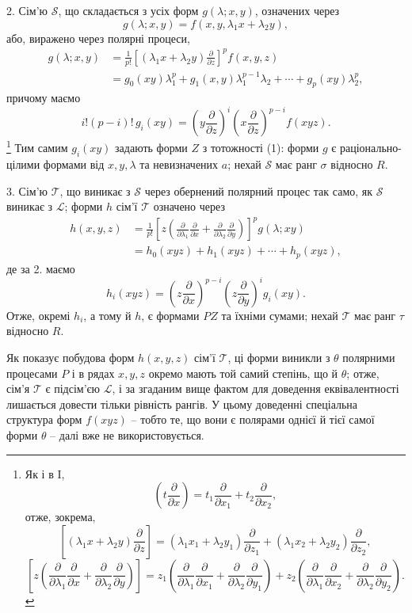 \documentclass[11pt]{article}
\begin{document}
2. Сім'ю $\mathcal S$, що складається з усіх форм $g(\lambda;x,y)$, означених через
\[
  g(\lambda;x,y)=f(x,y,\lambda_1x+\lambda_2y),
\]
або, виражено через полярні процеси,
\[
\begin{aligned}
  g(\lambda;x,y)
  &=\frac1{p!}\left[(\lambda_1x+\lambda_2y)\frac{\partial}{\partial z}\right]^p f(x,y,z) \\
  &=g_0(xy)\lambda_1^p+g_1(x,y)\lambda_1^{p-1}\lambda_2+\cdots+g_p(xy)\lambda_2^p,
\end{aligned}
\]
причому маємо
\[
  i!(p-i)!\,g_i(xy)=
  \left(y\frac{\partial}{\partial z}\right)^i
  \left(x\frac{\partial}{\partial z}\right)^{p-i}f(xyz).
\]
\footnote{Як і в I,
\[
 \left(t\frac{\partial}{\partial x}\right)=t_1\frac{\partial}{\partial x_1}+t_2\frac{\partial}{\partial x_2},
\]
отже, зокрема,
\[
 \left[(\lambda_1x+\lambda_2y)\frac{\partial}{\partial z}\right]
 = (\lambda_1x_1+\lambda_2y_1)\frac{\partial}{\partial z_1}
 + (\lambda_1x_2+\lambda_2y_2)\frac{\partial}{\partial z_2},
\]
\[
 \left[z\left(\frac{\partial}{\partial\lambda_1}\frac{\partial}{\partial x}
 +\frac{\partial}{\partial\lambda_2}\frac{\partial}{\partial y}\right)\right]
 =z_1\left(\frac{\partial}{\partial\lambda_1}\frac{\partial}{\partial x_1}
 +\frac{\partial}{\partial\lambda_2}\frac{\partial}{\partial y_1}\right)
 +z_2\left(\frac{\partial}{\partial\lambda_1}\frac{\partial}{\partial x_2}
 +\frac{\partial}{\partial\lambda_2}\frac{\partial}{\partial y_2}\right).
\]}
Тим самим $g_i(xy)$ задають форми $Z$ з тотожності (1): форми $g$ є раціонально-цілими формами від $x,y,\lambda$ та невизначених $a$; нехай $\mathcal S$ має ранг $\sigma$ відносно $R$.

3. Сім'ю $\mathcal T$, що виникає з $\mathcal S$ через обернений полярний процес так само, як $\mathcal S$ виникає з $\mathcal L$; форми $h$ сім'ї $\mathcal T$ означено через
\[
\begin{aligned}
 h(x,y,z)
 &=\frac1{p!}\left[z\left(\frac{\partial}{\partial\lambda_1}\frac{\partial}{\partial x}
 +\frac{\partial}{\partial\lambda_2}\frac{\partial}{\partial y}\right)\right]^p g(\lambda;xy)\\
 &=h_0(xyz)+h_1(xyz)+\cdots+h_p(xyz),
\end{aligned}
\]
де за 2. маємо
\[
  h_i(xyz)=
  \left(z\frac{\partial}{\partial x}\right)^{p-i}
  \left(z\frac{\partial}{\partial y}\right)^i g_i(xy).
\]
Отже, окремі $h_i$, а тому й $h$, є формами $PZ$ та їхніми сумами; нехай $\mathcal T$ має ранг $\tau$ відносно $R$.

Як показує побудова форм $h(x,y,z)$ сім'ї $\mathcal T$, ці форми виникли з $\theta$ полярними процесами $P$ і в рядах $x,y,z$ окремо мають той самий степінь, що й $\theta$; отже, сім'я $\mathcal T$ є підсім'єю $\mathcal L$, і за згаданим вище фактом для доведення еквівалентності лишається довести тільки рівність рангів. У цьому доведенні спеціальна структура форм $f(xyz)$ -- тобто те, що вони є полярами однієї й тієї самої форми $\theta$ -- далі вже не використовується.
\end{document}
